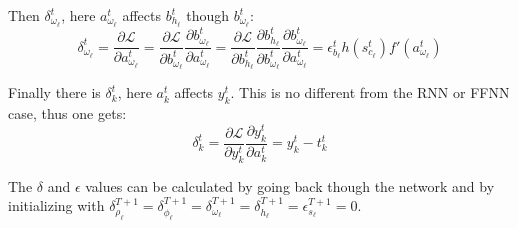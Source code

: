 Then $\delta_{\omega_\ell}^t$, here $a_{\omega_\ell}^t$ affects $b_{h_\ell}^t$ though $b_{\omega_\ell}^t$:
\begin{equation}
\delta_{\omega_\ell}^t
= \frac{\partial \mathcal{L}}{\partial a_{\omega_\ell}^t}
= \frac{\partial \mathcal{L}}{\partial b_{\omega_\ell}^t} \frac{\partial b_{\omega_\ell}^t}{\partial a_{\omega_\ell}^t}
= \frac{\partial \mathcal{L}}{\partial b_{h_\ell}^t} \frac{\partial b_{h_\ell}^t}{\partial b_{\omega_\ell}^t} \frac{\partial b_{\omega_\ell}^t}{\partial a_{\omega_\ell}^t}
= \epsilon_{b_\ell}^t h(s_{c_\ell}^t) f'(a_{\omega_\ell}^t)
\end{equation}

Finally there is $\delta_k^t$, here $a_k^t$ affects $y_k^t$. This is no different from the RNN or FFNN case, thus one gets:
\begin{equation}
\delta_k^t = \frac{\partial \mathcal{L}}{\partial y_k^t} \frac{\partial y_k^t}{\partial a_k^t} = y_k^t - t_k^t
\end{equation}

The $\delta$ and $\epsilon$ values can be calculated by going back though the network and by initializing with $\delta_{\rho_\ell}^{T+1} = \delta_{\phi_\ell}^{T+1} = \delta_{\omega_\ell}^{T+1} = \delta_{h_\ell}^{T+1} = \epsilon_{s_\ell}^{T+1} = 0$. 
